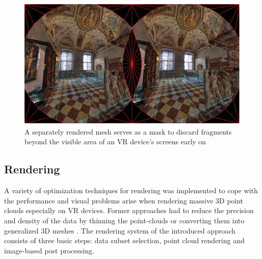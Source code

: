 \documentclass[10pt,twocolumn,letterpaper]{article}
\begin{document}
\begin{figure}
		\includegraphics{pointcloud_3.png}
	\caption{A separately rendered mesh serves as a mask to discard fragments beyond the visible area of an VR device’s screens early on}
	\label{fig:pointcloud_2}
\end{figure}
\subsection{Rendering}
A variety of optimization techniques for rendering was implemented to cope with the performance and visual problems arise when rendering massive 3D point clouds especially on VR devices. Former approaches had to reduce the precision and density of the data by thinning the point-clouds \cite{kreylos2008immersive} or converting them into generalized 3D meshes \cite{berger2017survey}. The rendering system of the introduced approach consists of three basic steps: data subset selection, point cloud rendering and image-based post processing.
\end{document}
